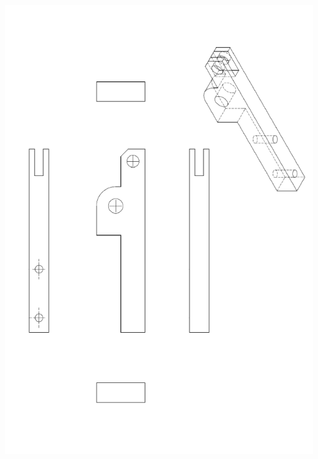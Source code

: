 \documentclass[11pt,oneside]{article}
\begin{document}
\begin{center}
\includegraphics[height=\textheight]{png/fig9}
\end{center}

\end{document}
